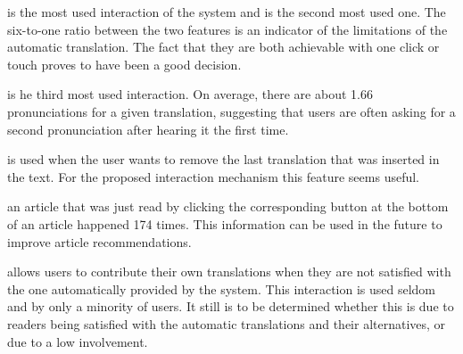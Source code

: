  is the most used interaction of the system and  is the second most used one. The six-to-one ratio between the two features is an indicator of the limitations of the automatic translation. The fact that they are both achievable with one click or touch proves to have been a good decision. 

 is he third most used interaction. On average, there are about 1.66 pronunciations for a given translation, suggesting that users are often asking for a second pronunciation after hearing it the first time. 




 is used when the user wants to remove the last translation that was inserted in the text. For the proposed interaction mechanism this feature seems useful. 

 an article that was just read by clicking the corresponding button at the bottom of an article happened 174 times. This information can be used in the future to improve article recommendations.

 allows users to contribute their own translations when they are not satisfied with the one automatically provided by the system. This interaction is used seldom and by only a minority of users. It still is to be determined whether this is due to readers being satisfied with the automatic translations and their alternatives, or due to a low involvement.

